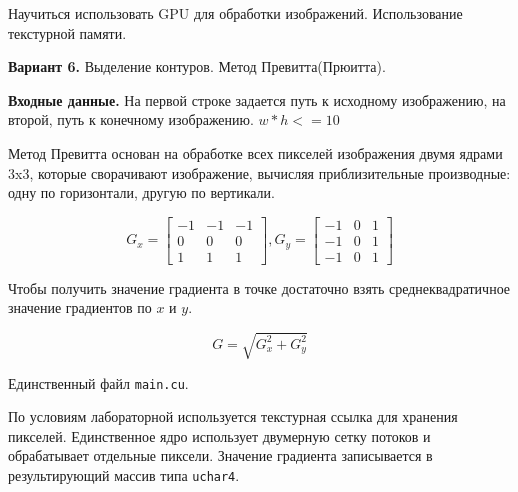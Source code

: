 \documentclass[12pt]{article}
\begin{document}


Научиться использовать GPU для обработки изображений.
Использование текстурной памяти.

\textbf{Вариант 6.} Выделение контуров. Метод Превитта(Прюитта).

\textbf{Входные данные.} На первой строке задается путь к исходному изображению,
на второй, путь к конечному изображению. $w*h <= 10$

\nvidia


Метод Превитта основан на обработке всех пикселей изображения двумя ядрами 3x3,
которые сворачивают изображение, вычисляя приблизительные производные:
одну по горизонтали, другую по вертикали.

\[
	G_x = \begin{bmatrix}
		-1 & -1 & -1 \\
		0  & 0  & 0  \\
		1  & 1  & 1
	\end{bmatrix},
	G_y = \begin{bmatrix}
		-1 & 0 & 1 \\
		-1 & 0 & 1 \\
		-1 & 0 & 1
	\end{bmatrix}
\]

Чтобы получить значение градиента в точке достаточно взять среднеквадратичное значение градиентов по $x$ и $y$.

\[
	G=\sqrt{G_x^2+G_y^2}
\]

Единственный файл \lstinline|main.cu|.

По условиям лабораторной используется текстурная ссылка для хранения пикселей.
Единственное ядро использует двумерную сетку потоков и обрабатывает отдельные пиксели.
Значение градиента записывается в результирующий массив типа \lstinline|uchar4|.


\newpage

\end{document}
